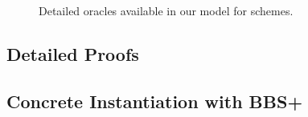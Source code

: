 {\begin{figure*}[ht!]
{\begin{minipage}[t]{.5\textwidth}

        
      \end{minipage}
      
    }

    \caption{Detailed oracles available in our model for \GSAC schemes.}
    \label{fig:oracles}
  \end{figure*}
}

\subsection{Detailed Proofs}
\label{sapp:gsac-proofs}

\subsection{Concrete Instantiation with BBS+}
\label{sapp:gsac-instantiation}

